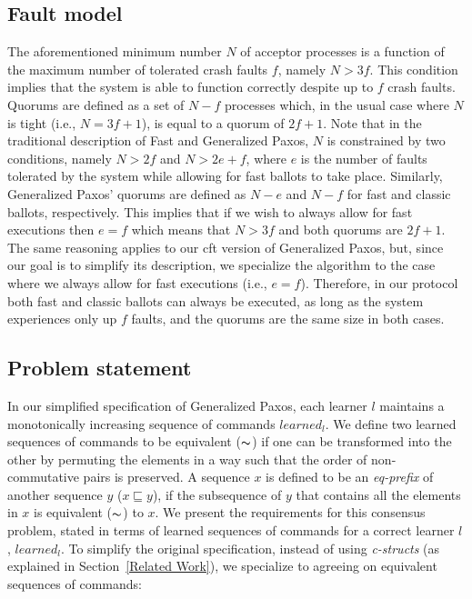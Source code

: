 \subsection{Fault model}
The aforementioned minimum number $N$ of acceptor processes is a function of the maximum number of tolerated crash faults $f$, namely $N > 3f$. This condition implies that the system is able to function correctly despite up to $f$ crash faults. Quorums are defined as a set of $N-f$ processes which, in the usual case where $N$ is tight (i.e., $N=3f+1$), is equal to a quorum of $2f+1$. Note that in the traditional description of Fast and Generalized Paxos, $N$ is constrained by two conditions, namely $N>2f$ and $N>2e+f$, where $e$ is the number of faults tolerated by the system while allowing for fast ballots to take place. Similarly, Generalized Paxos' quorums are defined as $N-e$ and $N-f$ for fast and classic ballots, respectively. This implies that if we wish to always allow for fast executions then $e=f$ which means that $N>3f$ and both quorums are $2f+1$. The same reasoning applies to our \acrshort{cft} version of Generalized Paxos, but, since our goal is to simplify its description, we specialize the algorithm to the case where we always allow for fast executions (i.e., $e=f$). Therefore, in our protocol both fast and classic ballots can always be executed, as long as the system experiences only up $f$ faults, and the quorums are the same size in both cases.

\subsection{Problem statement} \label{cft_problem}
In our simplified specification of Generalized Paxos, each learner $l$ maintains a monotonically increasing sequence of commands $learned_l$. We define two learned sequences of commands to be equivalent ($\thicksim$) if one can be transformed into the other by permuting the elements in a way such that the order of non-commutative pairs is preserved. A sequence $x$ is defined to be an \textit{eq-prefix} of another sequence $y$ ($x \sqsubseteq y$), if the subsequence of $y$ that contains all the elements in $x$ is equivalent ($\thicksim$) to $x$. We present the requirements for this consensus problem, stated in terms of learned sequences of commands for a correct learner $l$, $learned_l$. To simplify the original specification, instead of using \textit{c-structs} (as explained in Section~\ref{Related Work}), we specialize to agreeing on equivalent sequences of commands:

